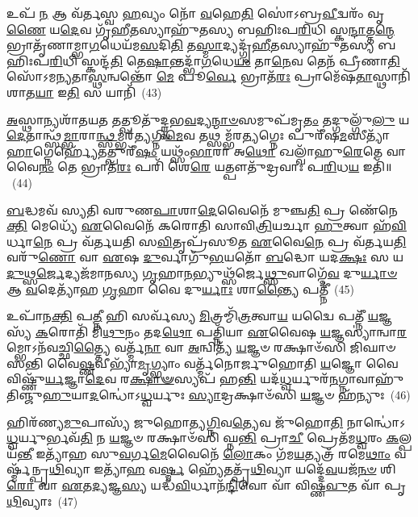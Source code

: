 𑌉𑌪᳴ \ul{𑌨} 𑌆 𑌵᳴𑌰𑍍𑌤𑌸𑍍𑌵 \ul{𑌹}\-𑌵𑍍𑌯𑌂 𑌨𑍋᳴ \ul{𑌵}\-𑌹𑍇\-\ul{𑌤𑌿} 𑌸𑍋॑\-𑌽𑌬𑍍𑌰\-\ul{𑌵𑍀}\-𑌦𑍍𑌵𑌰𑌂᳴ 𑌵𑍃\-\ul{𑌣𑍈} 𑌯\-\ul{𑌦𑍇}\-𑌵 𑌗𑍃᳴\-\ul{𑌹𑍀}\-𑌤𑌸𑍍𑌯𑌾𑌹𑍁᳴𑌤𑌸𑍍𑌯 𑌬𑌹𑌿𑌃𑌪\-\ul{𑌰𑌿}\-𑌧𑌿 𑌸𑍍𑌕\-\ul{𑌨𑍍𑌦𑌾}\-𑌤𑍍𑌤\-\ul{𑌨𑍍𑌮𑍇} 𑌭𑍍𑌰𑌾𑌤𑍃᳴𑌣𑌾𑌮𑍍𑌭𑌾\-\ul{𑌗}\-𑌧𑍇𑌯᳴𑌮\-\ul{𑌸}\-𑌦𑌿\-\ul{𑌤𑌿} 𑌤\-\ul{𑌸𑍍𑌮𑌾}\-𑌦𑍍𑌯𑌦𑍍𑌗𑍃᳴\-\ul{𑌹𑍀}\-𑌤𑌸𑍍𑌯𑌾𑌹𑍁᳴𑌤𑌸𑍍𑌯 𑌬𑌹𑌿𑌃𑌪\-\ul{𑌰𑌿}\-𑌧𑌿 𑌸𑍍𑌕𑌨𑍍𑌦᳴\-\ul{𑌤𑌿} 𑌤𑍇\-\ul{𑌷𑌾}\-𑌨𑍍𑌤𑌦𑍍𑌭𑌾᳴\-\ul{𑌗}\-𑌧𑍇\-\ul{𑌯𑌂} 𑌤𑌾\-\ul{𑌨𑍇}\-𑌵 𑌤𑍇𑌨᳴ 𑌪𑍍𑌰𑍀𑌣𑌾\-\ul{𑌤𑌿} 𑌸𑍋᳴\-𑌽𑌮𑌨𑍍𑌯𑌤𑌾\-\ul{𑌸𑍍𑌥}\-𑌨𑍍𑌵𑌨𑍍𑌤𑍋᳴ \ul{𑌮𑍇} 𑌪𑍂\-\ul{𑌰𑍍𑌵𑍇} 𑌭𑍍𑌰𑌾𑌤᳴\-\ul{𑌰𑌃} 𑌪𑍍𑌰𑌾𑌮𑍇᳴𑌷\-\ul{𑌤𑌾}\-𑌸𑍍𑌥𑌾𑌨𑌿᳴ 𑌶𑌾𑌤\-\ul{𑌯𑌾} 𑌇\-\ul{𑌤𑌿} 𑌸 𑌯𑌾𑌨𑌿᳴~(43)

\-\ul{𑌅}\-𑌸𑍍𑌥𑌾𑌨𑍍𑌯𑌶𑌾᳴𑌤𑌯\-\ul{𑌤} 𑌤𑌤𑍍𑌪𑍂𑌤𑍁᳴𑌦𑍍𑌰𑍍𑌵𑌭\-\ul{𑌵}\-𑌦𑍍𑌯\-\ul{𑌨𑍍𑌮𑌾}\-\-\ul{𑍞}\-𑌸𑌮𑍁𑌪᳴𑌮𑍃\-\ul{𑌤𑌂} 𑌤𑌦𑍍𑌗𑍁𑌲𑍍𑌗𑍁᳴\-\ul{𑌲𑍁} 𑌯\-\ul{𑌦𑍇}\-𑌤𑌾𑌨𑍍𑌥𑍍𑌸᳴\-\ul{𑌮𑍍𑌭𑌾}\-𑌰𑌾\-\ul{𑌨𑍍𑌥𑍍𑌸}\-𑌮𑍍𑌭𑌰᳴\-\ul{𑌤𑍍𑌯}\-𑌗𑍍𑌨𑌿\-\ul{𑌮𑍇}\-𑌵 𑌤𑌥𑍍𑌸𑌮𑍍𑌭᳴𑌰\-\ul{𑌤𑍍𑌯}\-𑌗𑍍𑌨𑍇𑌃 𑌪𑍁𑌰𑍀᳴𑌷\-\ul{𑌮}\-𑌸𑍀𑌤𑍍𑌯𑌾᳴\-\ul{𑌹𑌾}\-𑌗𑍍𑌨𑍇𑌰𑍍\mbox{}𑌹𑍍𑌯𑍇᳴𑌤𑌤𑍍𑌪𑍁𑌰𑍀᳴\-\ul{𑌷𑌂} 𑌯𑌥𑍍𑌸𑌂᳴\-\ul{𑌭𑌾}\-𑌰𑌾 𑌅\-\ul{𑌥𑍋} 𑌖𑌲𑍍𑌵𑌾᳴𑌹𑍁\-\ul{𑌰𑍇}\-𑌤𑍇 𑌵𑌾𑌵𑍈\-\ul{𑌨𑌂} 𑌤𑍇 𑌭𑍍𑌰𑌾𑌤᳴\-\ul{𑌰𑌃} 𑌪𑌰𑌿᳴ 𑌶𑍇\-\ul{𑌰𑍇} 𑌯𑌤𑍍𑌪𑍗𑌤𑍁᳴𑌦𑍍𑌰𑌵𑌾𑌃 𑌪\-\ul{𑌰𑌿}\-𑌧\-\ul{𑌯} 𑌇𑌤𑌿᳴॥~(44)

{\anuvakamend[{\-\ul{𑌵𑌿}\-𑌤𑍍𑌤𑍍𑌵𑌾 𑌦𑍇᳴𑌵\-\ul{𑌯}\-𑌤 \ul{𑌏}\-𑌷𑌾𑌮᳴𑌬𑍍𑌰𑍁\-\ul{𑌵}\-𑌨𑍍 𑌯𑌾\-\ul{𑌨𑌿} 𑌚𑌤𑍁᳴𑌶𑍍𑌚𑌤𑍍𑌵𑌾𑌰𑌿𑍞𑌶𑌚𑍍𑌚}]}%

\-\ul{𑌬}\-𑌦𑍍𑌧𑌮𑌵᳴ 𑌸𑍍𑌯𑌤𑌿 𑌵𑌰𑍁𑌣\-\ul{𑌪𑌾}\-𑌶𑌾\-\ul{𑌦𑍇}\-𑌵𑍈𑌨𑍇᳴ 𑌮𑍁𑌞𑍍𑌚\-\ul{𑌤𑌿} 𑌪𑍍𑌰 𑌣𑍇᳴𑌨𑍇\-\ul{𑌕𑍍𑌤𑌿} 𑌮𑍇𑌧𑍍𑌯𑍇᳴ \ul{𑌏}\-𑌵𑍈𑌨𑍇᳴ 𑌕𑌰𑍋𑌤𑌿 𑌸𑌾𑌵𑌿\-\ul{𑌤𑍍𑌰𑌿}\-𑌯𑌰𑍍𑌚𑌾 \ul{𑌹𑍁}\-𑌤𑍍𑌵𑌾 𑌹᳴\-\ul{𑌵𑌿}\-𑌰𑍍𑌧𑌾\-\ul{𑌨𑍇} 𑌪𑍍𑌰 𑌵᳴𑌰𑍍𑌤𑌯𑌤𑌿 𑌸\-\ul{𑌵𑌿}\-𑌤𑍃𑌪𑍍𑌰᳴𑌸𑍂𑌤 \ul{𑌏}\-𑌵𑍈\-\ul{𑌨𑍇} 𑌪𑍍𑌰 𑌵᳴𑌰𑍍𑌤𑌯\-\ul{𑌤𑌿} 𑌵𑌰𑍁᳴\-\ul{𑌣𑍋} 𑌵𑌾 \ul{𑌏}\-𑌷 \ul{𑌦𑍁}\-𑌰𑍍𑌵𑌾𑌗𑍁᳴\-\ul{𑌭}\-𑌯𑌤𑍋᳴ \ul{𑌬}\-𑌦𑍍𑌧𑍋 𑌯𑌦\-\ul{𑌕𑍍𑌷𑌃} 𑌸 𑌯\-\ul{𑌦𑍁}\-𑌥𑍍𑌸\-\ul{𑌰𑍍𑌜𑍇}\-𑌦𑍍𑌯𑌜᳴𑌮𑌾𑌨𑌸𑍍𑌯 \ul{𑌗𑍃}\-𑌹𑌾\-\ul{𑌨}\-𑌭𑍍𑌯𑍁𑌥𑍍𑌸᳴𑌰𑍍𑌜𑍇\-\ul{𑌥𑍍𑌸𑍁}\-𑌵𑌾𑌗𑍍𑌦𑍇᳴\-\ul{𑌵} 𑌦𑍁\-\ul{𑌰𑍍𑌯𑌾}\-\-\ul{𑍞} 𑌆 \ul{𑌵}\-𑌦𑍇𑌤𑍍𑌯𑌾᳴𑌹 \ul{𑌗𑍃}\-𑌹𑌾 𑌵𑍈 𑌦𑍁\-\ul{𑌰𑍍𑌯𑌾𑌃} 𑌶𑌾\-\ul{𑌨𑍍𑌤𑍍𑌯𑍈} 𑌪𑌤𑍍𑌨𑍀॑~(45)

𑌉𑌪𑌾᳴𑌨\-\ul{𑌕𑍍𑌤𑌿} 𑌪\-\ul{𑌤𑍍𑌨𑍀} 𑌹𑌿 𑌸𑌰𑍍𑌵᳴𑌸𑍍𑌯 \ul{𑌮𑌿}\-𑌤𑍍𑌰𑌮𑍍𑌮𑌿᳴\-\ul{𑌤𑍍𑌰}\-𑌤𑍍𑌵𑌾\-\ul{𑌯} 𑌯𑌦𑍍𑌵𑍈 𑌪𑌤𑍍𑌨𑍀᳴ \ul{𑌯}\-𑌜𑍍𑌞𑌸𑍍𑌯᳴ \ul{𑌕}\-𑌰𑍋𑌤𑌿᳴ 𑌮𑌿\-\ul{𑌥𑍁}\-𑌨𑌂 𑌤𑌦\-\ul{𑌥𑍋} 𑌪𑌤𑍍𑌨𑌿᳴𑌯𑌾 \ul{𑌏}\-𑌵𑍈𑌷 \ul{𑌯}\-𑌜𑍍𑌞𑌸𑍍𑌯𑌾॑𑌨𑍍𑌵𑌾\-\ul{𑌰}\-𑌮𑍍𑌭𑍋\-𑌽𑌨᳴𑌵𑌚𑍍𑌛𑌿\-\ul{𑌤𑍍𑌤𑍍𑌯𑍈} 𑌵𑌰𑍍𑌤𑍍𑌮᳴\-\ul{𑌨𑌾} 𑌵𑌾 \ul{𑌅}\-𑌨𑍍𑌵𑌿𑌤𑍍𑌯᳴ \ul{𑌯}\-𑌜𑍍𑌞𑍞 𑌰𑌕𑍍𑌷𑌾𑍞᳴𑌸𑌿 𑌜𑌿𑌘𑌾𑍞𑌸𑌨𑍍𑌤𑌿 𑌵𑍈\-\ul{𑌷𑍍𑌣}\-𑌵𑍀𑌭𑍍𑌯𑌾᳴\-\ul{𑌮𑍃}\-𑌗𑍍𑌭𑍍𑌯𑌾𑌂 𑌵𑌰𑍍𑌤𑍍𑌮᳴𑌨𑍋𑌰𑍍𑌜𑍁𑌹𑍋𑌤𑌿 \ul{𑌯}\-𑌜𑍍𑌞𑍋 𑌵𑍈 𑌵𑌿𑌷𑍍𑌣𑍁᳴\-\ul{𑌰𑍍𑌯}\-𑌜𑍍𑌞𑌾\-\ul{𑌦𑍇}\-𑌵 𑌰\-\ul{𑌕𑍍𑌷𑌾}\-\-\ul{𑍟}\-𑌸𑍍𑌯𑌪᳴ 𑌹\-\ul{𑌨𑍍𑌤𑌿} 𑌯𑌦᳴\-\ul{𑌧𑍍𑌵}\-𑌰𑍍𑌯𑍁𑌰᳴\-\ul{𑌨}\-𑌗𑍍𑌨𑌾𑌵𑌾𑌹𑍁᳴𑌤𑌿𑌞𑍍𑌜𑍁\-\ul{𑌹𑍁}\-𑌯𑌾\-\ul{𑌦}\-𑌨𑍍𑌧𑍋॑\-𑌽\-\ul{𑌧𑍍𑌵}\-𑌰𑍍𑌯𑍁𑌃 \ul{𑌸𑍍𑌯𑌾}\-𑌦𑍍𑌰𑌕𑍍𑌷𑌾𑍞᳴𑌸𑌿 \ul{𑌯}\-𑌜𑍍𑌞𑍞 𑌹᳴𑌨𑍍𑌯𑍁𑌃~(46)

𑌹𑌿𑌰᳴𑌣𑍍𑌯\-\ul{𑌮𑍁}\-𑌪𑌾𑌸𑍍𑌯᳴ 𑌜𑍁𑌹𑍋𑌤𑍍𑌯\-\ul{𑌗𑍍𑌨𑌿}\-𑌵\-\ul{𑌤𑍍𑌯𑍇}\-𑌵 𑌜𑍁᳴𑌹𑍋\-\ul{𑌤𑌿} 𑌨𑌾𑌨𑍍𑌧𑍋॑\-𑌽\-\ul{𑌧𑍍𑌵}\-𑌰𑍍𑌯𑍁𑌰𑍍𑌭𑌵᳴\-\ul{𑌤𑌿} 𑌨 \ul{𑌯}\-𑌜𑍍𑌞𑍞 𑌰𑌕𑍍𑌷𑌾𑍞᳴𑌸𑌿 𑌘𑍍𑌨\-\ul{𑌨𑍍𑌤𑌿} 𑌪𑍍𑌰𑌾\-\ul{𑌚𑍀} 𑌪𑍍𑌰𑍇𑌤᳴𑌮\-\ul{𑌧𑍍𑌵}\-𑌰𑌂 \ul{𑌕}\-𑌲𑍍𑌪𑌯᳴\-\ul{𑌨𑍍𑌤𑍀} 𑌇𑌤𑍍𑌯𑌾᳴𑌹 𑌸𑍁\-\ul{𑌵}\-𑌰𑍍𑌗\-\ul{𑌮𑍇}\-𑌵𑍈𑌨𑍇᳴ \ul{𑌲𑍋}\-𑌕𑌂 𑌗᳴𑌮\-\ul{𑌯}\-𑌤𑍍𑌯𑌤𑍍𑌰᳴ 𑌰𑌮𑍇\-\ul{𑌥𑌾𑌂} 𑌵𑌰𑍍𑌷𑍍𑌮᳴𑌨𑍍𑌪𑍃\-\ul{𑌥𑌿}\-𑌵𑍍𑌯𑌾 𑌇𑌤𑍍𑌯𑌾᳴\-\ul{𑌹} 𑌵\-\ul{𑌰𑍍𑌷𑍍𑌮} 𑌹𑍍𑌯𑍇᳴𑌤𑌤𑍍𑌪𑍃᳴\-\ul{𑌥𑌿}\-𑌵𑍍𑌯𑌾 𑌯𑌦𑍍𑌦𑍇᳴\-\ul{𑌵}\-𑌯𑌜᳴\-\ul{𑌨}\-\-\ul{𑍞} 𑌶𑌿\-\ul{𑌰𑍋} 𑌵𑌾 \ul{𑌏}\-𑌤\-\ul{𑌦𑍍𑌯}\-𑌜𑍍𑌞\-\ul{𑌸𑍍𑌯} 𑌯𑌦𑍍𑌧᳴\-\ul{𑌵𑌿}\-𑌰𑍍𑌧𑌾𑌨᳴\-\ul{𑌨𑍍𑌦𑌿}\-𑌵𑍋 𑌵𑌾᳴ 𑌵𑌿𑌷𑍍𑌣\-\ul{𑌵𑍁}\-𑌤 𑌵𑌾᳴ 𑌪𑍃\-\ul{𑌥𑌿}\-𑌵𑍍𑌯𑌾𑌃~(47)

